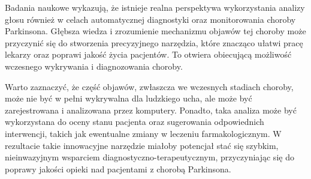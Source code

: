 Badania naukowe wykazują, że istnieje realna perspektywa wykorzystania analizy głosu również w celach automatycznej diagnostyki oraz monitorowania choroby Parkinsona.
Głębsza wiedza i zrozumienie mechanizmu objawów tej choroby może przyczynić się do stworzenia precyzyjnego narzędzia, które znacząco ułatwi pracę lekarzy
oraz poprawi jakość życia pacjentów.
To otwiera obiecującą możliwość wczesnego wykrywania i diagnozowania choroby.

Warto zaznaczyć, że część objawów, zwłaszcza we wczesnych stadiach choroby, może nie być w pełni wykrywalna dla ludzkiego ucha, ale może być
zarejestrowana i analizowana przez komputery.
Ponadto, taka analiza może być wykorzystana do oceny stanu pacjenta oraz sugerowania odpowiednich interwencji, takich jak ewentualne zmiany w
leczeniu farmakologicznym.
W rezultacie takie innowacyjne narzędzie miałoby potencjał stać się szybkim, nieinwazyjnym wsparciem diagnostyczno-terapeutycznym,
przyczyniając się do poprawy jakości opieki nad pacjentami z chorobą Parkinsona.